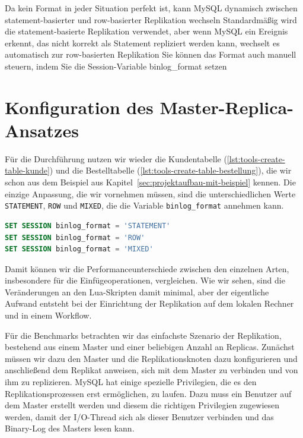 Da kein Format in jeder Situation perfekt ist, kann MySQL dynamisch zwischen statement-basierter und row-basierter Replikation wechseln
Standardmäßig wird die statement-basierte Replikation verwendet, aber wenn MySQL ein Ereignis erkennt, das nicht korrekt als Statement repliziert werden kann, wechselt es automatisch zur row-basierten Replikation
Sie können das Format auch manuell steuern, indem Sie die Session-Variable binlog\_format setzen

\section{Konfiguration des Master-Replica-Ansatzes}\label{sec:replication-konfiguration}

Für die Durchführung nutzen wir wieder die Kundentabelle (\ref{lst:tools-create-table-kunde}) und die Bestelltabelle (\ref{lst:tools-create-table-bestellung}), die wir schon aus dem Beispiel aus Kapitel~\ref{sec:projektaufbau-mit-beispiel} kennen.
Die einzige Anpassung, die wir vornehmen müssen, sind die unterschiedlichen Werte \texttt{STATEMENT}, \texttt{ROW} und \texttt{MIXED}, die die Variable \texttt{binlog\_format} annehmen kann.

\vspace{-5pt}
\begin{lstlisting}[language=SQL,caption=Unterschiedliche Formatimplementationen,label={lst:replication-change-format}]
SET SESSION binlog_format = 'STATEMENT'
SET SESSION binlog_format = 'ROW'
SET SESSION binlog_format = 'MIXED'
\end{lstlisting}
\vspace{-5pt}

Damit können wir die Performanceunterschiede zwischen den einzelnen Arten, insbesondere für die Einfügeoperationen, vergleichen.
Wie wir sehen, sind die Veränderungen an den Lua-Skripten damit minimal, aber der eigentliche Aufwand entsteht bei der Einrichtung der Replikation auf dem lokalen Rechner und in einem Workflow.

Für die Benchmarks betrachten wir das einfachste Szenario der Replikation, bestehend aus einem Master und einer beliebigen Anzahl an Replicas.
Zunächst müssen wir dazu den Master und die Replikationsknoten dazu konfigurieren und anschließend dem Replikat anweisen, sich mit dem Master zu verbinden und von ihm zu replizieren.
MySQL hat einige spezielle Privilegien, die es den Replikationsprozessen erst ermöglichen, zu laufen.
Dazu muss ein Benutzer auf dem Master erstellt werden und diesem die richtigen Privilegien zugewiesen werden, damit der I/O-Thread sich als dieser Benutzer verbinden und das Binary-Log des Masters lesen kann.

